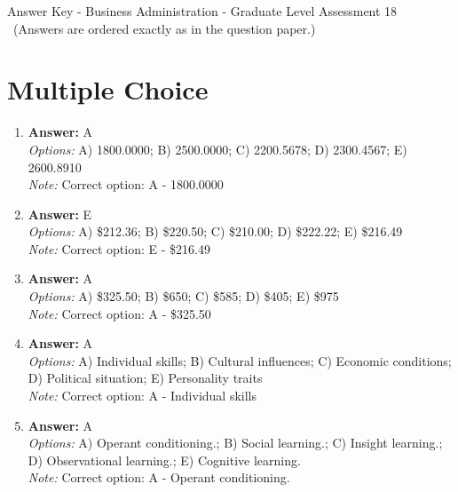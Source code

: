 \documentclass[12pt]{article}
\begin{document}
\begin{center}
Answer Key - Business Administration - Graduate Level Assessment 18 \
\small (Answers are ordered exactly as in the question paper.)
\end{center}

\section*{Multiple Choice}
\begin{enumerate}[label=\arabic*.]
\item \textbf{Answer:} A
\\ \textit{Options:} A) 1800.0000; B) 2500.0000; C) 2200.5678; D) 2300.4567; E) 2600.8910
\\ \textit{Note:} Correct option: A - 1800.0000
\item \textbf{Answer:} E
\\ \textit{Options:} A) \$212.36; B) \$220.50; C) \$210.00; D) \$222.22; E) \$216.49
\\ \textit{Note:} Correct option: E - \$216.49
\item \textbf{Answer:} A
\\ \textit{Options:} A) \$325.50; B) \$650; C) \$585; D) \$405; E) \$975
\\ \textit{Note:} Correct option: A - \$325.50
\item \textbf{Answer:} A
\\ \textit{Options:} A) Individual skills; B) Cultural influences; C) Economic conditions; D) Political situation; E) Personality traits
\\ \textit{Note:} Correct option: A - Individual skills
\item \textbf{Answer:} A
\\ \textit{Options:} A) Operant conditioning.; B) Social learning.; C) Insight learning.; D) Observational learning.; E) Cognitive learning.
\\ \textit{Note:} Correct option: A - Operant conditioning.
\end{enumerate}
\end{document}
